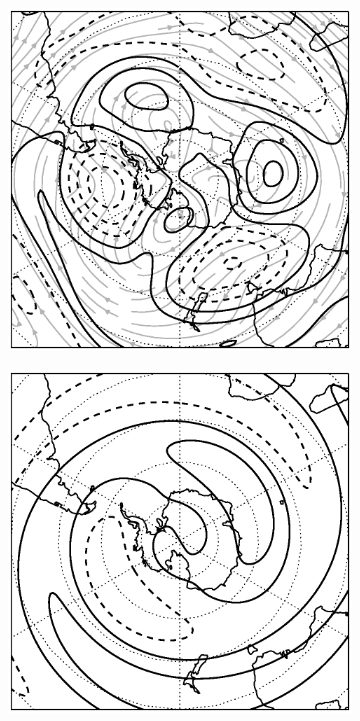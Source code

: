 \begin{figure}
\centering
\begin{subfigure}[c]{0.617\textwidth}
\includegraphics[width=\textwidth]{figures/zonalwaves/example-sf-wind_2001-07-16.eps}
\end{subfigure}\qquad
\begin{subfigure}[c]{0.289\textwidth}
\includegraphics[width=\textwidth]{figures/zonalwaves/example-wave1-sf-zonal-anom_2001-07-16.eps}


\end{subfigure}
\end{figure}
